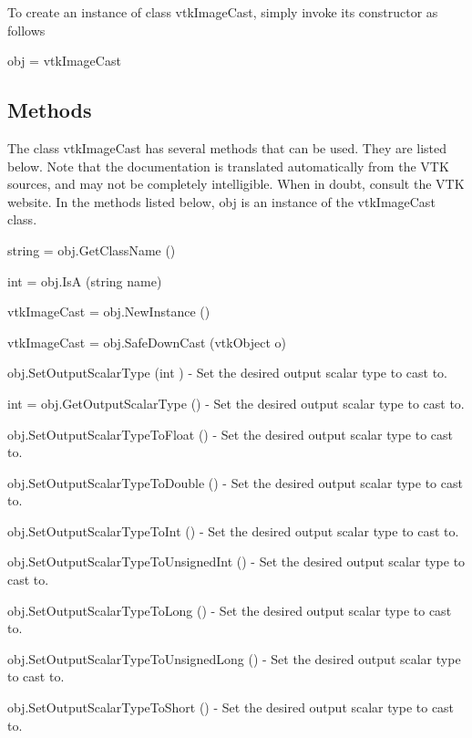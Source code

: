 To create an instance of class vtk\-Image\-Cast, simply invoke its constructor as follows \begin{DoxyVerb}  obj = vtkImageCast
\end{DoxyVerb}
 \hypertarget{vtkwidgets_vtkxyplotwidget_Methods}{}\subsection{Methods}\label{vtkwidgets_vtkxyplotwidget_Methods}
The class vtk\-Image\-Cast has several methods that can be used. They are listed below. Note that the documentation is translated automatically from the V\-T\-K sources, and may not be completely intelligible. When in doubt, consult the V\-T\-K website. In the methods listed below, {\ttfamily obj} is an instance of the vtk\-Image\-Cast class. 
\begin{DoxyItemize}
\item {\ttfamily string = obj.\-Get\-Class\-Name ()}  
\item {\ttfamily int = obj.\-Is\-A (string name)}  
\item {\ttfamily vtk\-Image\-Cast = obj.\-New\-Instance ()}  
\item {\ttfamily vtk\-Image\-Cast = obj.\-Safe\-Down\-Cast (vtk\-Object o)}  
\item {\ttfamily obj.\-Set\-Output\-Scalar\-Type (int )} -\/ Set the desired output scalar type to cast to.  
\item {\ttfamily int = obj.\-Get\-Output\-Scalar\-Type ()} -\/ Set the desired output scalar type to cast to.  
\item {\ttfamily obj.\-Set\-Output\-Scalar\-Type\-To\-Float ()} -\/ Set the desired output scalar type to cast to.  
\item {\ttfamily obj.\-Set\-Output\-Scalar\-Type\-To\-Double ()} -\/ Set the desired output scalar type to cast to.  
\item {\ttfamily obj.\-Set\-Output\-Scalar\-Type\-To\-Int ()} -\/ Set the desired output scalar type to cast to.  
\item {\ttfamily obj.\-Set\-Output\-Scalar\-Type\-To\-Unsigned\-Int ()} -\/ Set the desired output scalar type to cast to.  
\item {\ttfamily obj.\-Set\-Output\-Scalar\-Type\-To\-Long ()} -\/ Set the desired output scalar type to cast to.  
\item {\ttfamily obj.\-Set\-Output\-Scalar\-Type\-To\-Unsigned\-Long ()} -\/ Set the desired output scalar type to cast to.  
\item {\ttfamily obj.\-Set\-Output\-Scalar\-Type\-To\-Short ()} -\/ Set the desired output scalar type to cast to.  

\end{DoxyItemize}
